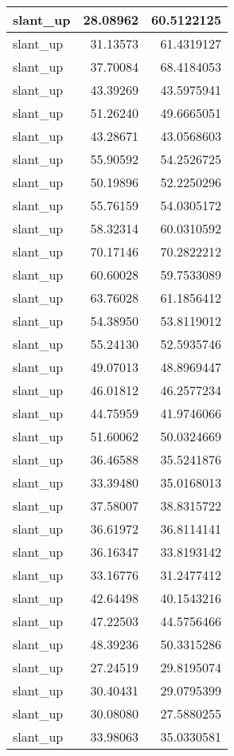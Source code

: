\documentclass[
]{book}
\theoremstyle{definition}
\theoremstyle{definition}
\theoremstyle{definition}
\theoremstyle{definition}
\theoremstyle{remark}
\begin{document}
\begin{tabular}{l|r|r}
\hline
slant\_up & 28.08962 & 60.5122125\\
\hline
slant\_up & 31.13573 & 61.4319127\\
\hline
slant\_up & 37.70084 & 68.4184053\\
\hline
slant\_up & 43.39269 & 43.5975941\\
\hline
slant\_up & 51.26240 & 49.6665051\\
\hline
slant\_up & 43.28671 & 43.0568603\\
\hline
slant\_up & 55.90592 & 54.2526725\\
\hline
slant\_up & 50.19896 & 52.2250296\\
\hline
slant\_up & 55.76159 & 54.0305172\\
\hline
slant\_up & 58.32314 & 60.0310592\\
\hline
slant\_up & 70.17146 & 70.2822212\\
\hline
slant\_up & 60.60028 & 59.7533089\\
\hline
slant\_up & 63.76028 & 61.1856412\\
\hline
slant\_up & 54.38950 & 53.8119012\\
\hline
slant\_up & 55.24130 & 52.5935746\\
\hline
slant\_up & 49.07013 & 48.8969447\\
\hline
slant\_up & 46.01812 & 46.2577234\\
\hline
slant\_up & 44.75959 & 41.9746066\\
\hline
slant\_up & 51.60062 & 50.0324669\\
\hline
slant\_up & 36.46588 & 35.5241876\\
\hline
slant\_up & 33.39480 & 35.0168013\\
\hline
slant\_up & 37.58007 & 38.8315722\\
\hline
slant\_up & 36.61972 & 36.8114141\\
\hline
slant\_up & 36.16347 & 33.8193142\\
\hline
slant\_up & 33.16776 & 31.2477412\\
\hline
slant\_up & 42.64498 & 40.1543216\\
\hline
slant\_up & 47.22503 & 44.5756466\\
\hline
slant\_up & 48.39236 & 50.3315286\\
\hline
slant\_up & 27.24519 & 29.8195074\\
\hline
slant\_up & 30.40431 & 29.0795399\\
\hline
slant\_up & 30.08080 & 27.5880255\\
\hline
slant\_up & 33.98063 & 35.0330581\\

\end{tabular}
\end{document}
